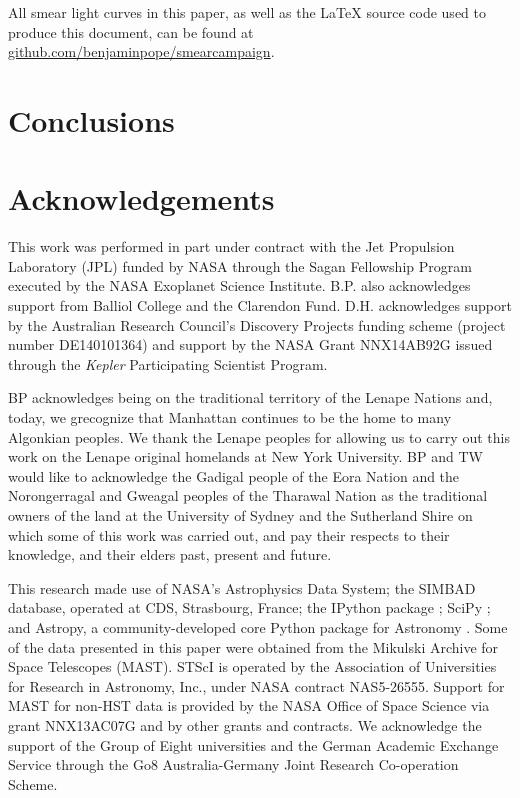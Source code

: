 \documentclass[a4paper,fleqn,usenatbib]{mnras}
\begin{document}
All smear light curves in this paper, as well as the \LaTeX{} source code used to produce this document, can be found
at \url{github.com/benjaminpope/smearcampaign}.


\section{Conclusions}
\label{conclusions}



\section*{Acknowledgements} %

This work was performed in part under contract with the Jet Propulsion Laboratory (JPL) funded by NASA through the Sagan Fellowship Program executed by the NASA Exoplanet Science Institute. B.P. also acknowledges support from Balliol College and the Clarendon Fund. D.H. acknowledges support by the Australian Research Council's Discovery Projects funding scheme (project number DE140101364) and support by the NASA Grant NNX14AB92G issued through the \emph{Kepler} Participating Scientist Program.

BP acknowledges being on the traditional territory of the Lenape Nations and, today, we grecognize that Manhattan continues to be the home to many Algonkian peoples. We thank the Lenape peoples for allowing us to carry out this work on the Lenape original homelands at New York University. BP and TW would like to acknowledge the Gadigal people of the Eora Nation and the Norongerragal and Gweagal peoples of the Tharawal Nation as the traditional owners of the land at the University of Sydney and the Sutherland Shire on which some of this work was carried out, and pay their respects to their knowledge, and their elders past, present and future.

This research made use of NASA's Astrophysics Data System; the SIMBAD database, operated at CDS, Strasbourg, France; the IPython package \citep{PER-GRA:2007}; SciPy \citep{jones_scipy_2001}; and Astropy, a community-developed core Python package for Astronomy \citep{2013A&A...558A..33A}. Some of the data presented in this paper were obtained from the Mikulski Archive for Space Telescopes (MAST). STScI is operated by the Association of Universities for Research in Astronomy, Inc., under NASA contract NAS5-26555. Support for MAST for non-HST data is provided by the NASA Office of Space Science via grant NNX13AC07G and by other grants and contracts. We acknowledge the support of the Group of Eight universities and the German Academic Exchange Service through the Go8 Australia-Germany Joint Research Co-operation Scheme. 
\end{document}
